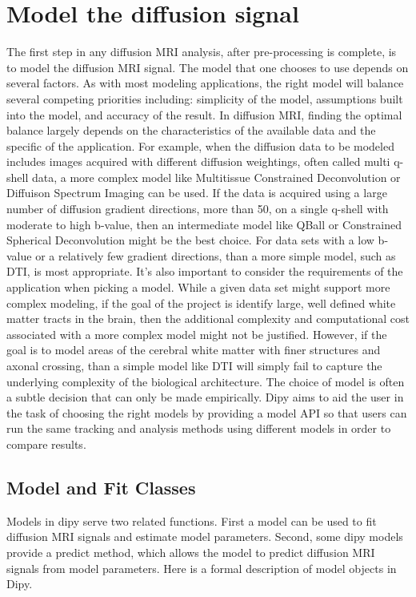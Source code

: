 \section{Model the diffusion signal}
The first step in any diffusion MRI analysis, after pre-processing is complete, is to model the diffusion MRI signal. The model that one chooses to use depends on several factors. As with most modeling applications, the right model will balance several competing priorities including: simplicity of the model, assumptions built into the model, and accuracy of the result. In diffusion MRI, finding the optimal balance largely depends on the characteristics of the available data and the specific of the application. For example, when the diffusion data to be modeled includes images acquired with different diffusion weightings, often called multi q-shell data, a more complex model like Multitissue Constrained Deconvolution or Diffuison Spectrum Imaging can be used. If the data is acquired using a large number of diffusion gradient directions, more than 50, on a single q-shell with moderate to high b-value, then an intermediate model like QBall or Constrained Spherical Deconvolution might be the best choice. For data sets with a low b-value or a relatively few gradient directions, than a more simple model, such as DTI, is most appropriate. It's also important to consider the requirements of the application when picking a model. While a given data set might support more complex modeling, if the goal of the project is identify large, well defined white matter tracts in the brain, then the additional complexity and computational cost associated with a more complex model might not be justified. However, if the goal is to model areas of the cerebral white matter with finer structures and axonal crossing, than a simple model like DTI will simply fail to capture the underlying complexity of the biological architecture. The choice of model is often a subtle decision that can only be made empirically. Dipy aims to aid the user in the task of choosing the right models by providing a model API so that users can run the same tracking and analysis methods using different models in order to compare results.

\subsection{Model and Fit Classes}
Models in dipy serve two related functions. First a model can be used to fit diffusion MRI signals and estimate model parameters. Second, some dipy models provide a predict method, which allows the model to predict diffusion MRI signals from model parameters. Here is a formal description of model objects in Dipy.

